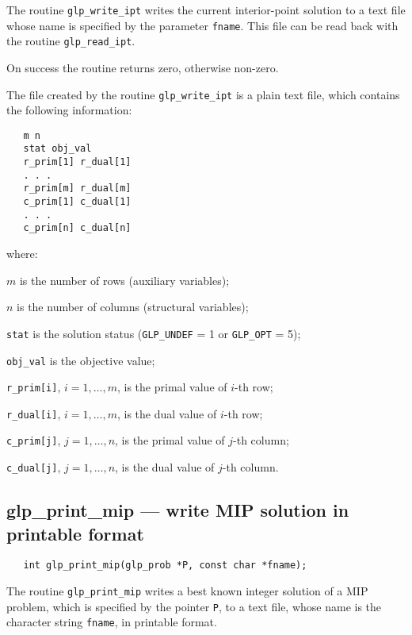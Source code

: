 The routine \verb|glp_write_ipt| writes the current interior-point
solution to a text file whose name is specified by the parameter
\verb|fname|. This file can be read back with the routine
\verb|glp_read_ipt|.

\returns

On success the routine returns zero, otherwise non-zero.


The file created by the routine \verb|glp_write_ipt| is a plain text
file, which contains the following information:

\begin{verbatim}
   m n
   stat obj_val
   r_prim[1] r_dual[1]
   . . .
   r_prim[m] r_dual[m]
   c_prim[1] c_dual[1]
   . . .
   c_prim[n] c_dual[n]
\end{verbatim}

\noindent
where:

\noindent
$m$ is the number of rows (auxiliary variables);

\noindent
$n$ is the number of columns (structural variables);

\noindent
\verb|stat| is the solution status (\verb|GLP_UNDEF| = 1 or
\verb|GLP_OPT| = 5);

\noindent
\verb|obj_val| is the objective value;

\noindent
\verb|r_prim[i]|, $i=1,\dots,m$, is the primal value of $i$-th row;

\noindent
\verb|r_dual[i]|, $i=1,\dots,m$, is the dual value of $i$-th row;

\noindent
\verb|c_prim[j]|, $j=1,\dots,n$, is the primal value of $j$-th column;

\noindent
\verb|c_dual[j]|, $j=1,\dots,n$, is the dual value of $j$-th column.

\subsection{glp\_print\_mip --- write MIP solution in printable format}

\synopsis

\begin{verbatim}
   int glp_print_mip(glp_prob *P, const char *fname);
\end{verbatim}

\description

The routine \verb|glp_print_mip| writes a best known integer solution
of a MIP problem, which is specified by the pointer \verb|P|, to
a text file, whose name is the character string \verb|fname|, in
printable format.

